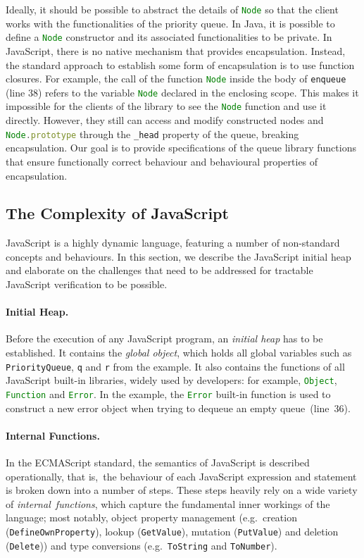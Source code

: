 \documentclass{llncs}
\def\jsinline{\lstinline[language=JavaScript, basicstyle=\small]}
\begin{document}
Ideally,  it should be possible to abstract the details of
\jsinline|Node| so that the client works with the functionalities of
the priority queue.
In Java, it is possible to define a \jsinline|Node| constructor and
its associated functionalities to be private. In JavaScript, there
is no native mechanism that provides encapsulation. Instead, the
standard approach to establish some form of encapsulation is to use
function closures. For example, the call of the function
\jsinline|Node| inside the body of \jsinline|enqueue| (line 38) refers
to the variable \jsinline|Node| declared in the enclosing scope. This
makes it impossible for the clients of the library to see the
\jsinline|Node| function and use it directly. However, they still can
access and modify constructed nodes and \jsinline|Node.prototype|
through the \jsinline|_head| property of the queue, breaking
encapsulation.  Our goal is to provide specifications of the queue
library functions that ensure functionally correct behaviour and
behavioural properties of encapsulation.

\subsection*{The Complexity of JavaScript}
JavaScript is a highly dynamic language, featuring a number of non-standard concepts and behaviours. In this section, we describe the JavaScript initial heap and elaborate on the challenges that need to be addressed for tractable JavaScript verification to be possible.

\paragraph{Initial Heap.} 
Before the execution of any JavaScript program, 
an \emph{initial heap} has to be established. 
It contains the \emph{global object}, which holds all global variables such as \jsinline|PriorityQueue|, \jsinline|q|  and \jsinline|r| from the example.
It also contains the functions
of all JavaScript built-in libraries, widely used by developers: for example, \jsinline|Object|,
\jsinline|Function| and \jsinline|Error|.
In the example, the \jsinline|Error| built-in function is used 
to construct a new error object when trying to dequeue an empty queue~(line~36). 

\paragraph{Internal Functions.} 
In the ECMAScript standard, the semantics of JavaScript is described operationally, that is,~the behaviour of each JavaScript expression and statement is broken down into a number of steps. These steps heavily rely on a wide variety of  \emph{internal~functions}, which capture the fundamental inner workings of the language; most notably, object property management (e.g.~creation (\jsinline|DefineOwnProperty|), lookup (\jsinline|GetValue|), mutation (\jsinline|PutValue|) and deletion (\jsinline|Delete|)) and type conversions (e.g.~\jsinline|ToString| and \jsinline|ToNumber|). 
\end{document}
